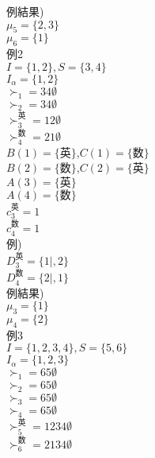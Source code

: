 \documentclass[a4j,10pt]{jsarticle}
\theoremstyle{definition}
\theoremstyle{remark}
\theoremstyle{plain}
\begin{document}
\begin{tcolorbox}[enhanced,breakable=true]
例結果)\\
$\mu_5 = \{2,3\}$\\
$\mu_6 = \{1\}$\\


例2\\
$I = \{1,2\}, S = \{3,4\}$\\
$I_\alpha = \{1,2\}$\\

$\succ_1 = 34\emptyset$\\
$\succ_2 = 34\emptyset$\\

$\succ_3^{英} = 12\emptyset$\\
$\succ_4^{数} = 21\emptyset$\\



$B(1) = \{\text{英}\}$,$C(1) = \{\text{数}\}$\\
$B(2) = \{\text{数}\}$,$C(2) = \{\text{英}\}$\\

$A(3) = \{\text{英}\}$\\
$A(4) = \{\text{数}\}$\\

$c_3^{\text{英}} = 1$\\
$c_4^{\text{数}} = 1$\\

例)\\
$D_3^{\text{英}} = \{1|,2\}$\\
$D_4^{\text{数}} = \{2|,1\}$\\

例結果)\\
$\mu_3 = \{1\}$\\
$\mu_4 = \{2\}$\\



例3\\
$I = \{1,2,3,4\}, S = \{5,6\}$\\
$I_\alpha = \{1,2,3\}$\\

$\succ_1 = 65\emptyset$\\
$\succ_2 = 65\emptyset$\\
$\succ_3 = 65\emptyset$\\
$\succ_4 = 65\emptyset$\\


$\succ_5^{英} = 1234\emptyset$\\
$\succ_6^{数} = 2134\emptyset$\\




\end{tcolorbox}
\end{document}

